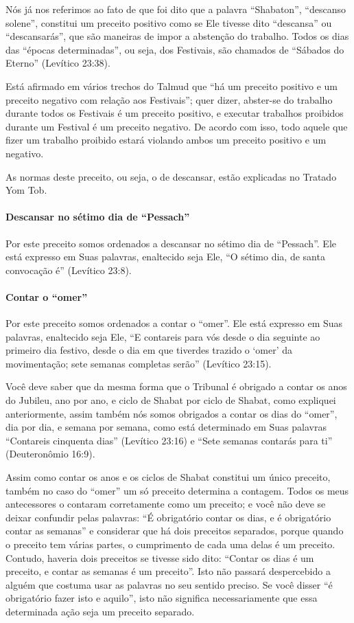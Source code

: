 Nós já nos referimos ao fato de que foi dito que a palavra
``Shabaton'', ``descanso solene'', constitui um preceito positivo como
se Ele tivesse dito ``descansa'' ou ``descansarás'', que são maneiras de
impor a abstenção do trabalho. Todos os dias das ``épocas
determinadas'', ou seja, dos Festivais, são chamados de ``Sábados do
Eterno'' (Levítico 23:38).

Está afirmado em vários trechos do Talmud que ``há um preceito positivo
e um preceito negativo com relação aos Festivais''; quer dizer,
abster-se do trabalho durante todos os Festivais é um preceito positivo,
e executar trabalhos proibidos durante um Festival é um preceito
negativo. De acordo com isso, todo aquele que fizer um trabalho
proibido estará violando ambos um preceito positivo e um negativo.

As normas deste preceito, ou seja, o de descansar, estão explicadas no
Tratado Yom Tob.

\paragraph{Descansar no sétimo dia de ``Pessach''}

Por este preceito somos ordenados a descansar no sétimo dia de
``Pessach''. Ele está expresso em Suas palavras, enaltecido seja Ele,
``O sétimo dia, de santa convocação é'' (Levítico 23:8).

\paragraph{Contar o ``omer''}

Por este preceito somos ordenados a contar o ``omer''. Ele está
expresso em Suas palavras, enaltecido seja Ele, ``E contareis para vós
desde o dia seguinte ao primeiro dia festivo, desde o dia em que
tiverdes trazido o `omer' da movimentação; sete semanas completas
serão'' (Levítico 23:15).

Você deve saber que da mesma forma que o Tribunal é obrigado a contar os
anos do Jubileu, ano por ano, e ciclo de Shabat por ciclo de Shabat,
como expliquei anteriormente, assim também nós somos obrigados a contar
os dias do ``omer'', dia por dia, e semana por semana, como está
determinado em Suas palavras ``Contareis cinquenta dias'' (Levítico
23:16) e ``Sete semanas contarás para ti'' (Deuteronômio 16:9).

Assim como contar os anos e os ciclos de Shabat constitui um único
preceito, também no caso do ``omer'' um só preceito determina a
contagem. Todos os meus antecessores o contaram corretamente como um
preceito; e você não deve se deixar confundir pelas palavras: ``É
obrigatório contar os dias, e é obrigatório contar as semanas'' e
considerar que há dois preceitos separados, porque quando o preceito tem
várias partes, o cumprimento de cada uma delas é um preceito. Contudo,
haveria dois preceitos se tivesse sido dito: ``Contar os dias é um
preceito, e contar as semanas é um preceito''. Isto não passará
despercebido a alguém que costuma usar as palavras no seu sentido
preciso. Se você disser ``é obrigatório fazer isto e aquilo'', isto não
significa necessariamente que essa determinada ação seja um preceito
separado.

